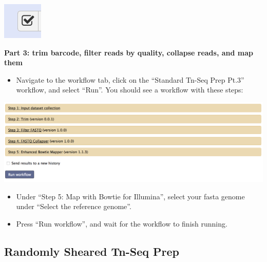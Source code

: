 \documentclass{article}
\begin{document}
\includegraphics[scale=1.0]{opbutton.png}

\vspace{5 mm}

\noindent
\textbf{Part 3: trim barcode, filter reads by quality, collapse reads, and map them}
\vspace{5 mm}

\begin{itemize}

\item Navigate to the workflow tab, click on the “Standard Tn-Seq Prep Pt.3” workflow, and select “Run”. You should see a workflow with these steps:

\end{itemize}

\vspace{5 mm}

\noindent
\includegraphics[scale=0.5]{StandPrep3.png}

\vspace{5 mm}

\begin{itemize}

\item Under “Step 5: Map with Bowtie for Illumina”, select your fasta genome under “Select the reference genome”.
\item Press “Run workflow”, and wait for the workflow to finish running.

\end{itemize}

\newpage

\subsection{Randomly Sheared Tn-Seq Prep}
\label{subsec:random}

\vspace{2 mm}
\end{document}
